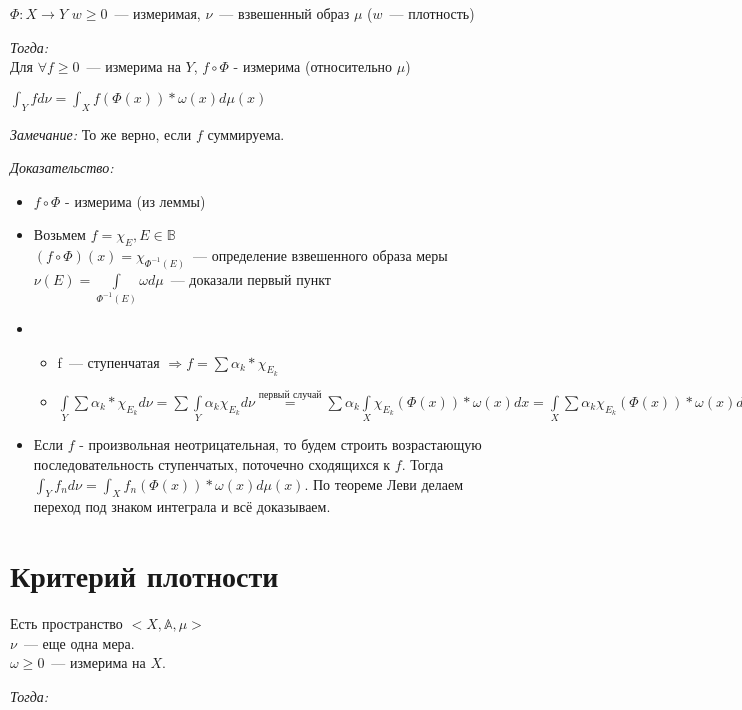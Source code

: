 \documentclass[paper=a4, fontsize=14pt]{report}
\begin{document}
		$\Phi: X\rightarrow Y$
        $w \geq 0$~--- измеримая, $\nu$~--- взвешенный образ $\mu$ ($w$~--- плотность)

		\emph{Тогда:}\\
		 Для $\forall f \geq 0$~--- измерима на $Y$, $f\circ \Phi$ - измерима (относительно $\mu$)

		$\int_{Y}f d\nu = \int_{X} f(\Phi(x)) * \omega(x) d\mu(x)$

		\emph{Замечание:} То же верно, если $f$ суммируема.


\emph{Доказательство:}

			\begin{itemize}
				\item $f\circ \Phi$ - измерима (из леммы)
				\item Возьмем $f = \chi_{E} , E\in \mathds{B}$ \\
				$(f\circ \Phi)(x) = \chi_{\Phi^{-1}(E)}$~--- определение взвешенного образа меры \\
				$\nu(E) = \int\limits_{\Phi^{-1}(E)}\omega d\mu$~--- доказали первый пункт
				\item
				\begin{itemize}
					\item f~--- ступенчатая $\Rightarrow f = \sum \alpha_k * \chi_{E_k}$
					\item $\int\limits_{Y} \sum \alpha_k * \chi_{E_k} d\nu = \sum \int\limits_{Y} \alpha_k \chi_{E_k} d\nu \overset{\textit{первый случай}}{=} \sum \alpha_k \int\limits_X \chi_{E_k}(\Phi(x))*\omega(x)dx = \int\limits_X \sum \alpha_k \chi_{E_k}(\Phi(x)) * \omega(x) d\mu(x) = \int f \circ \Phi * \omega d\mu$
				\end{itemize}
				\item Если $f$ - произвольная неотрицательная, то будем строить возрастающую последовательность ступенчатых, поточечно сходящихся к $f$. Тогда $\int_{Y}f_n d\nu = \int_{X} f_n(\Phi(x)) * \omega(x) d\mu(x)$. По теореме Леви делаем переход под знаком интеграла и всё доказываем.
\end{itemize}


\section{Критерий плотности}
	Есть пространство $<X, \mathbb{A}, \mu>$ \\
	$\nu$~--- еще одна мера. \\
	$\omega \geq 0$~--- измерима на $X$.

	\emph{Тогда:}
\end{document}
